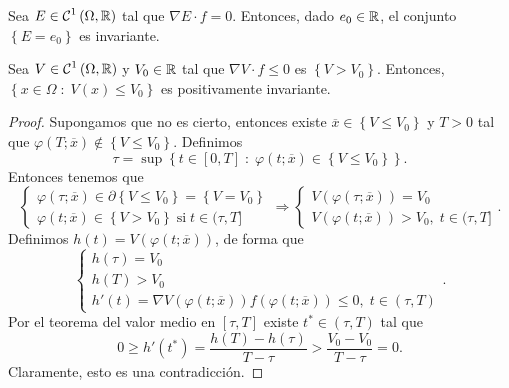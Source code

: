 \begin{colorary}
	Sea $\displaystyle E \in \mathcal{C}^{1}\left(\Omega, \mathbb{R}\right) $ tal que $\displaystyle \nabla E \cdot f = 0 $. Entonces, dado $\displaystyle e_{0}\in \mathbb{R} $, el conjunto $\displaystyle \left\{ E = e_{0}\right\}  $ es invariante. 
\end{colorary}
\begin{prop}
	Sea $\displaystyle V \in \mathcal{C}^{1}\left(\Omega, \mathbb{R}\right) $ y $\displaystyle V_{0}\in \mathbb{R} $ tal que $\displaystyle \nabla V \cdot f \leq 0 $ es $\displaystyle \left\{ V > V_{0}\right\}  $. Entonces, $\displaystyle \left\{ x \in \Omega \; : \; V\left(x\right)\leq V_{0}\right\}  $ es positivamente invariante. 
\end{prop}
\begin{proof}
	Supongamos que no es cierto, entonces existe $\displaystyle \overline{x}\in \left\{ V \leq V_{0}\right\}  $ y $\displaystyle T > 0 $ tal que $\displaystyle \varphi\left(T; \overline{x}\right)\not\in \left\{ V \leq V_{0}\right\}  $. Definimos 
	\[\tau = \sup \left\{ t \in [0,T] \; : \; \varphi\left(t; \overline{x}\right)\in \left\{ V \leq V_{0}\right\} \right\}  .\]
	Entonces tenemos que  
	\[
	\begin{cases}
	\varphi\left(\tau; \overline{x}\right)\in \partial \left\{ V\leq V_{0}\right\} = \left\{ V = V_{0}\right\} \\
	\varphi\left(t; \overline{x}\right)\in \left\{ V > V_{0}\right\} \; \text{si}\; t \in (\tau, T]
	\end{cases} \Rightarrow 
	\begin{cases}
	V\left(\varphi\left(\tau; \overline{x}\right)\right)=V_{0}\\
	V\left(\varphi\left(t; \overline{x}\right)\right) > V_{0}, \; t \in (\tau, T]
	\end{cases}
	.\]
	Definimos $\displaystyle h\left(t\right)=V\left(\varphi\left(t; \overline{x}\right)\right) $, de forma que 
	\[
	\begin{cases}
	h\left(\tau\right)=V_{0} \\
	h\left(T\right) > V_{0} \\
h'\left(t\right)=\nabla V\left(\varphi\left(t; \overline{x}\right)\right)f\left(\varphi\left(t; \overline{x}\right)\right)\leq 0, \; t \in \left(\tau, T\right)
	\end{cases}
	.\]
	Por el teorema del valor medio en $\displaystyle \left[\tau, T\right]  $ existe $\displaystyle t ^{*}\in \left(\tau, T\right) $ tal que 
	\[0 \geq h'\left(t ^{*}\right) = \frac{h\left(T\right)-h\left(\tau\right)}{T-\tau}>\frac{V_{0}-V_{0}}{T-\tau}=0 .\]
	Claramente, esto es una contradicción. 
\end{proof}
